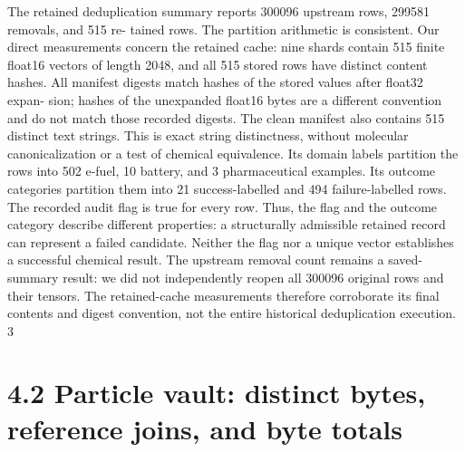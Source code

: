 \documentclass[11pt]{article}
\begin{document}
The retained deduplication summary reports 300096 upstream rows, 299581 removals, and 515 re-
tained rows. The partition arithmetic is consistent. Our direct measurements concern the retained
cache: nine shards contain 515 finite float16 vectors of length 2048, and all 515 stored rows have
distinct content hashes. All manifest digests match hashes of the stored values after float32 expan-
sion; hashes of the unexpanded float16 bytes are a different convention and do not match those
recorded digests.
The clean manifest also contains 515 distinct text strings. This is exact string distinctness,
without molecular canonicalization or a test of chemical equivalence. Its domain labels partition the
rows into 502 e-fuel, 10 battery, and 3 pharmaceutical examples. Its outcome categories partition
them into 21 success-labelled and 494 failure-labelled rows. The recorded audit flag is true for
every row. Thus, the flag and the outcome category describe different properties: a structurally
admissible retained record can represent a failed candidate. Neither the flag nor a unique vector
establishes a successful chemical result.
The upstream removal count remains a saved-summary result: we did not independently reopen
all 300096 original rows and their tensors. The retained-cache measurements therefore corroborate
its final contents and digest convention, not the entire historical deduplication execution.
3


\section*{4.2 Particle vault: distinct bytes, reference joins, and byte totals}
\end{document}
